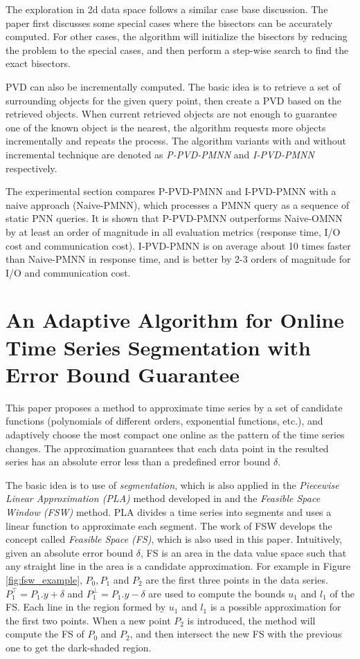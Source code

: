 \documentclass[paper=a4, fontsize=18pt]{article} %
\numberwithin{equation}{section} %
\numberwithin{figure}{section} %
\numberwithin{table}{section} %
\begin{document}
The exploration in 2d data space follows a similar case base discussion. The paper first discusses some special cases where the bisectors can be accurately computed. For other cases, the algorithm will initialize the bisectors by reducing the problem to the special cases, and then perform a step-wise search to find the exact bisectors.

PVD can also be incrementally computed. The basic idea is to retrieve a set of surrounding objects for the given query point, then create a PVD based on the retrieved objects. When current retrieved objects are not enough to guarantee one of the known object is the nearest, the algorithm requests more objects incrementally and repeats the process. The algorithm variants with and without incremental technique are denoted as \emph{P-PVD-PMNN} and \emph{I-PVD-PMNN} respectively.

The experimental section compares P-PVD-PMNN and I-PVD-PMNN with a naive approach (Naive-PMNN), which processes a PMNN query as a sequence of static PNN queries. It is shown that P-PVD-PMNN outperforms  Naive-OMNN by at least an order of magnitude in all evaluation metrics (response time, I/O cost and communication cost). I-PVD-PMNN is on average about 10 times faster than Naive-PMNN in response time, and is better by 2-3 orders of magnitude for I/O and communication cost.

\section{An Adaptive Algorithm for Online Time Series Segmentation with Error Bound Guarantee \cite{XZRP12}}

This paper proposes a method to approximate time series by a set of candidate functions (polynomials of different orders, exponential functions, etc.), and adaptively choose the most compact one online as the pattern of the time series changes. The approximation guarantees that each data point in the resulted series has an absolute error less than a predefined error bound $\delta$.

The basic idea is to use of \emph{segmentation}, which is also applied in the \emph{Piecewise Linear Approximation (PLA)} method developed in \cite{GS01} and the \emph{Feasible Space Window (FSW)} method. PLA divides a time series into segments and uses a linear function to approximate each segment. The work of FSW develops the concept called \emph{Feasible Space (FS)}, which is also used in this paper. Intuitively, given an absolute error bound $\delta$, FS is an area in the data value space such that any straight line in the area is a candidate approximation. For example in Figure \ref{fig:fsw_example}, $P_0, P_1 $ and $P_2$ are the first three points in the data series. $P_1^\top = P_1.y + \delta$ and $P_1^\bot = P_1.y - \delta$ are used to compute the bounds $u_1$ and $l_1$ of the FS. Each line in the region formed by $u_1$ and $l_1$ is a possible approximation for the first two points. When a new point $P_2$ is introduced, the method will compute the FS of $P_0$ and $P_2$, and then intersect the new FS with the previous one to get the dark-shaded region.
\end{document}
